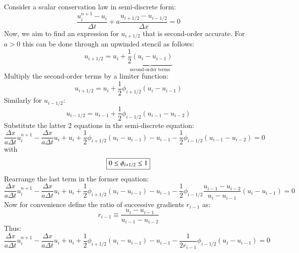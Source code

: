 \documentclass{warpdoc}
\newcommand\frameeqn[1]{\fbox{$\displaystyle #1$}}
\begin{document}
Consider a scalar conservation law in semi-discrete form:
%
\begin{equation}
\frac{u^{n+1}_i - u_i }{\Delta t} + a \frac{u_{i+1/2}-u_{i-1/2}}{\Delta x} =0
\end{equation}
%
Now, we aim to find an expression for $u_{i+1/2}$ that is second-order accurate. For $a>0$ this can be done through an upwinded stencil as follows:
%
\begin{equation}
u_{i+1/2} = u_i + \underbrace{\frac{1}{2} \left( u_i - u_{i-1} \right)}_{\textrm{second-order terms}}
\end{equation}
% 
Multiply the second-order terms by a limiter function:
%
\begin{equation}
u_{i+1/2} = u_i + \frac{1}{2} \phi_{i+1/2} \left( u_i - u_{i-1} \right)
\end{equation}
% 
Similarly for $u_{i-1/2}$:
%
\begin{equation}
u_{i-1/2} = u_{i-1} + \frac{1}{2} \phi_{i-1/2} \left( u_{i-1} - u_{i-2} \right)
\end{equation}
% 
Substitute the latter 2 equations in the semi-discrete equation:
%
\begin{equation}
\frac{\Delta x}{a\Delta t} u^{n+1}_i - \frac{\Delta x}{a\Delta t} u_i  
+ u_i + \frac{1}{2} \phi_{i+1/2} \left( u_i - u_{i-1} \right)
- u_{i-1} - \frac{1}{2} \phi_{i-1/2} \left( u_{i-1} - u_{i-2} \right) 
= 0
\end{equation}
%
with
%
\begin{equation}
\frameeqn{
0\le \phi_{i+1/2}\le 1
}
\end{equation}
%
Rearrange the last term in the former equation:
%
\begin{equation}
\frac{\Delta x}{a\Delta t} u^{n+1}_i - \frac{\Delta x}{a\Delta t} u_i  
+ u_i + \frac{1}{2} \phi_{i+1/2} \left( u_i - u_{i-1} \right)
- u_{i-1} - \frac{1}{2} \phi_{i-1/2} \frac{u_{i-1} - u_{i-2}}{u_{i} - u_{i-1}}(u_i-u_{i-1}) 
= 0
\end{equation}
%
Now for convenience define the ratio of successive gradients $r_{i-1}$ as:
%
\begin{equation}
r_{i-1} \equiv \frac{u_{i} - u_{i-1}}{u_{i-1} - u_{i-2}}
\label{eqn:ri}
\end{equation}
%
Thus:
%
\begin{equation}
\frac{\Delta x}{a\Delta t} u^{n+1}_i - \frac{\Delta x}{a\Delta t} u_i  
+ u_i + \frac{1}{2} \phi_{i+1/2} \left( u_i - u_{i-1} \right)
- u_{i-1} -  \frac{1}{2 r_{i-1}} \phi_{i-1/2}  (u_i-u_{i-1}) 
= 0
\end{equation}
\end{document}
